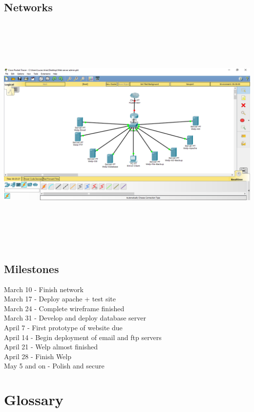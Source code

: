 \documentclass[12pt]{article}
\begin{document}
        \subsection{Networks}
                \includegraphics[width=15cm, height=12cm]{topology.png}

        \subsection{Milestones}
                March 10 - Finish network\\
                March 17 - Deploy apache + test site\\
                March 24 - Complete wireframe finished\\
                March 31 - Develop and deploy database server\\
                April 7 -  First prototype of website due\\
                April 14 - Begin deployment of email and ftp servers\\
                April 21 - Welp almost finished\\
                April 28 - Finish Welp\\
                May 5 and on - Polish and secure\\

\newpage
\section{Glossary}
\end{document}
